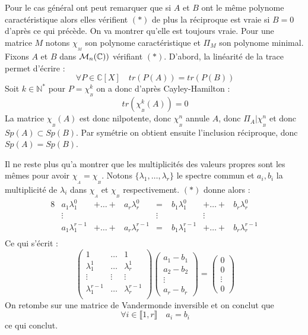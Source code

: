 \documentclass[letterpaper,10pt]{article}
\begin{document}
{Pour le cas général ont peut remarquer que si $A$ et $B$ ont le même polynome
 caractéristique alors elles vérifient $(*)$ de plus la réciproque est vraie 
 si $B=0$ d'après ce qui précède. On va montrer qu'elle est toujours vraie. 
 Pour une matrice $M$ notons $\chi_{_M}$ son polynome caractéristique et $\Pi{_M}$ 
 son polynome minimal. Fixons $A$ et $B$ dans $\mathcal{M}_n(\mathbb{C}))$ vérifiant $(*) $.
  D'abord, la linéarité de la trace permet d'écrire : \[\ \forall P \in 
  \mathbb{C}\left[X\right] \quad tr(P(A)) = tr(P(B)) \] 
Soit $k \in \mathbb{N}^*$ pour  $P = \chi_{_B}^k$ on a donc 
d'après Cayley-Hamilton : \[\ tr(\chi_{_B}^k(A)) = 0 \] La matrice
 $\chi_{_B}(A)$ est donc nilpotente, donc $\chi_{_B}^n$ annule $A$, donc
  $\Pi_{A} | \chi_{_B}^n$ et donc $Sp(A) \subset Sp(B)$. Par symétrie on 
  obtient ensuite l'inclusion réciproque, donc $Sp(A) = Sp(B)$.

Il ne reste plus qu'a montrer que les multiplicités des valeurs propres sont les
 mêmes pour avoir $\chi_{_A} =\chi_{_B}$. Notons $\{\lambda_1,\ldots,\lambda_r\}$ 
 le spectre commun et $a_i, b_i$ la multiplicité de $\lambda_i$ dans $\chi_{_A}$ 
 et $\chi_{_B}$ respectivement. $(*)$ donne alors :
\begin{alignat*}{8}
 &a_1\lambda_1^0 &+ \ldots  +& a_r\lambda_r^0 &=&\; b_1\lambda_1^0 &+ \ldots  +& b_r\lambda_r^0 \\
&\vdots & & & \vdots & & \vdots &\\
 &a_1\lambda_1^{r-1} &+ \ldots  +& a_r\lambda_r^{r-1} &=&\; b_1\lambda_1^{r-1} &+ \ldots  +& b_r\lambda_r^{r-1} \\
\end{alignat*} Ce qui s'écrit :
\[\ \begin{pmatrix}
1  &\ldots & 1 \\
\lambda_1^1 & \ldots & \lambda_r^1 \\
\vdots & \vdots & \vdots \\
\lambda_1^{r-1} & \ldots & \lambda_r^{r-1} \\
\end{pmatrix}\begin{pmatrix}a_1-b_1 \\ a_2-b_2\\ \vdots \\ a_r-b_r
\end{pmatrix}
=\begin{pmatrix}0 \\ 0\\ \vdots \\ 0
\end{pmatrix}\] On retombe sur une matrice de Vandermonde inversible et on conclut que \[\ \forall i \in \llbracket 1,r \rrbracket \quad a_i= b_i \] ce qui conclut.
}
\end{document}
